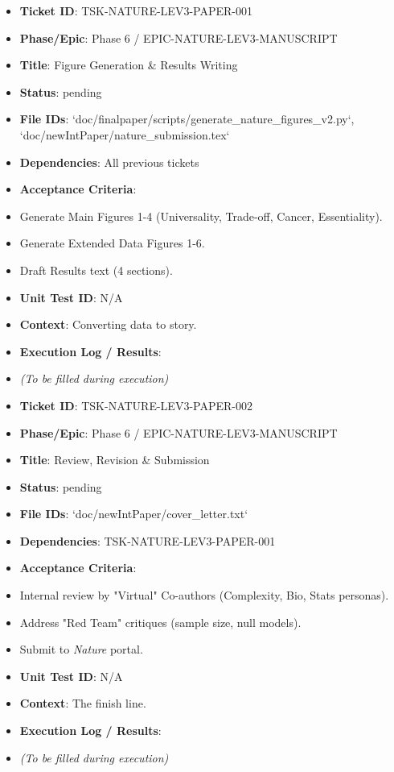 \documentclass{article}
\begin{document}
\begin{itemize}
\item   \textbf{Ticket ID}: TSK-NATURE-LEV3-PAPER-001
\item   \textbf{Phase/Epic}: Phase 6 / EPIC-NATURE-LEV3-MANUSCRIPT
\item   \textbf{Title}: Figure Generation \& Results Writing
\item   \textbf{Status}: pending
\item   \textbf{File IDs}: `doc/finalpaper/scripts/generate\_nature\_figures\_v2.py`, `doc/newIntPaper/nature\_submission.tex`
\item   \textbf{Dependencies}: All previous tickets
\item   \textbf{Acceptance Criteria}:
\item   Generate Main Figures 1-4 (Universality, Trade-off, Cancer, Essentiality).
\item   Generate Extended Data Figures 1-6.
\item   Draft Results text (4 sections).
\item   \textbf{Unit Test ID}: N/A
\item   \textbf{Context}: Converting data to story.
\item   \textbf{Execution Log / Results}:
\item   \textit{(To be filled during execution)}
\end{itemize}

\begin{itemize}
\item   \textbf{Ticket ID}: TSK-NATURE-LEV3-PAPER-002
\item   \textbf{Phase/Epic}: Phase 6 / EPIC-NATURE-LEV3-MANUSCRIPT
\item   \textbf{Title}: Review, Revision \& Submission
\item   \textbf{Status}: pending
\item   \textbf{File IDs}: `doc/newIntPaper/cover\_letter.txt`
\item   \textbf{Dependencies}: TSK-NATURE-LEV3-PAPER-001
\item   \textbf{Acceptance Criteria}:
\item   Internal review by "Virtual" Co-authors (Complexity, Bio, Stats personas).
\item   Address "Red Team" critiques (sample size, null models).
\item   Submit to \textit{Nature} portal.
\item   \textbf{Unit Test ID}: N/A
\item   \textbf{Context}: The finish line.
\item   \textbf{Execution Log / Results}:
\item   \textit{(To be filled during execution)}
\end{itemize}
\end{document}
